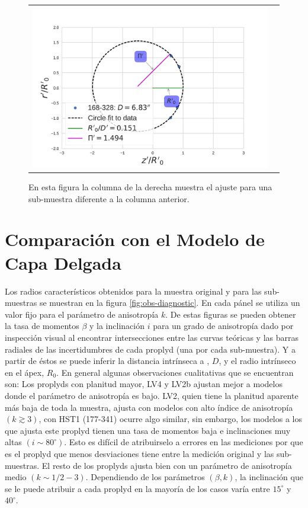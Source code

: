 \begin{figure}
\begin{tabular}{cc}
 \includegraphics[clip]{./Programs/Multi-Fit/samp01/LV-bowshocks-xyfancy-positionssamp01-168-328}
    \end{tabular}
    \caption{En esta figura la columna de la derecha muestra el ajuste para una sub-muestra diferente a la columna anterior.}
\end{figure}


\section{Comparación con el Modelo de Capa Delgada}

Los radios característicos obtenidos para la muestra original y para las sub-muestras se muestran en la figura \ref{fig:obs-diagnostic}. En cada pánel se utiliza un valor fijo para el parámetro de anisotropía $k$. De estas figuras se pueden obtener la tasa de momentos $\beta$ y la inclinación $i$ para un grado de anisotropía dado por inspección visual al encontrar intersecciones entre las curvas teóricas y las barras radiales de las incertidumbres de cada proplyd (una por cada sub-muestra). Y a partir de éstos se puede inferir la distancia intrínseca a \thC{}, $D$, y el radio intrínseco en el ápex, $R_0$. En general algunas observaciones cualitativas que se encuentran son: Los proplyds con planitud mayor, LV4 y LV2b ajustan mejor a modelos donde el parámetro de anisotropía es bajo. LV2, quien tiene la planitud aparente más baja de toda la muestra, ajusta con modelos con alto índice de anisotropía $(k \gtrsim 3)$, con HST1 (177-341) ocurre algo similar, sin embargo, los modelos a los que ajusta este proplyd tienen una tasa de momentos baja e inclinaciones muy altas $(i \sim 80^{\circ})$. Esto es difícil de atribuirselo a errores en las mediciones por que es el proplyd que menos desviaciones tiene entre la medición original y las sub-muestras. El resto de los proplyds ajusta bien con un parámetro de anisotropía medio $(k\sim 1/2 - 3)$. Dependiendo de los parámetros $(\beta, k)$, la inclinación que se le puede atribuir a cada proplyd en la mayoría de los casos varía entre $15^\circ$ y $40^\circ$. 

